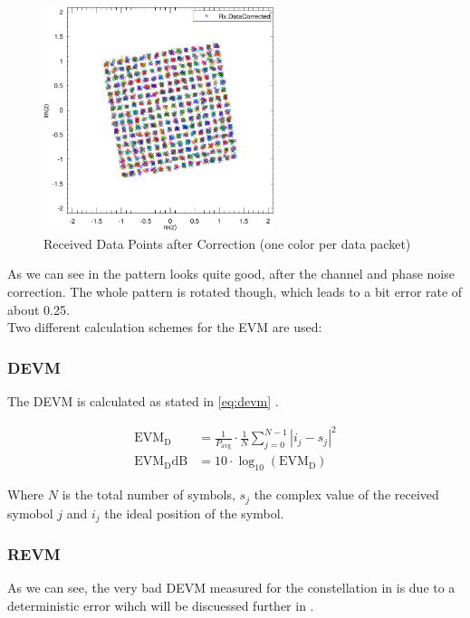 \begin{figure}[p]
  \centering
  \includegraphics[width=0.6\textwidth]{figures/matlab/res_450_cp_corrected}
  \caption{Received Data Points after Correction (one color per data packet)}
  \label{fig:res_450_cp_corrected}
\end{figure}

As we can see in  the pattern looks quite good,
after the channel and phase noise correction.
The whole pattern is rotated though, which leads to a bit error rate of
about 0.25. \\

Two different calculation schemes for the \acrfull{EVM} are used:

\subsubsection{\acrfull{DEVM}}
The \gls{DEVM} is calculated as stated in \eqref{eq:devm} \cite{razavi2011rf}.

\begin{align}
  \text{EVM}_\text{D} &= \frac{1}{P_{\text{avg}}} \cdot \frac{1}{N}
  \sum_{j=0}^{N-1} |i_j - s_j|^2
  \label{eq:devm} \\
  \text{EVM}_\text{D}\text{dB} &= 10 \cdot \log_{10} (\text{EVM}_\text{D})
\end{align}

Where $N$ is the total number of symbols, $s_j$ the complex value of the
received symobol $j$ and $i_j$ the ideal position of the symbol. \\

\subsubsection{\acrfull{REVM}}
As we can see, the very bad \gls{DEVM} measured for the constellation in
 is due to a deterministic error wihch will
be discuessed further in .

